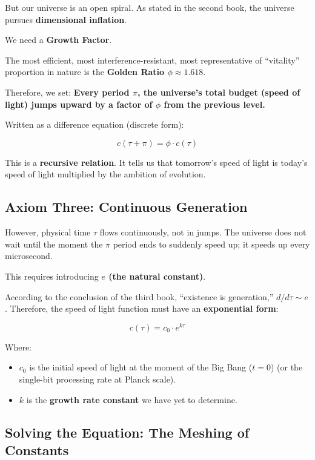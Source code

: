 But our universe is an open spiral. As stated in the second book, the universe pursues \textbf{dimensional inflation}.

We need a \textbf{Growth Factor}.

The most efficient, most interference-resistant, most representative of ``vitality'' proportion in nature is the \textbf{Golden Ratio $\phi \approx 1.618$}.

Therefore, we set: \textbf{Every period $\pi$, the universe's total budget (speed of light) jumps upward by a factor of $\phi$ from the previous level.}

Written as a difference equation (discrete form):

\[c(\tau + \pi) = \phi \cdot c(\tau)\]

This is a \textbf{recursive relation}. It tells us that tomorrow's speed of light is today's speed of light multiplied by the ambition of evolution.

\subsection{Axiom Three: Continuous Generation}

However, physical time $\tau$ flows continuously, not in jumps. The universe does not wait until the moment the $\pi$ period ends to suddenly speed up; it speeds up every microsecond.

This requires introducing \textbf{$e$ (the natural constant)}.

According to the conclusion of the third book, ``existence is generation,'' $d/d\tau \sim e$. Therefore, the speed of light function must have an \textbf{exponential form}:

\[c(\tau) = c_0 \cdot e^{k \tau}\]

Where:

\begin{itemize}
\item \textbf{$c_0$} is the initial speed of light at the moment of the Big Bang ($t=0$) (or the single-bit processing rate at Planck scale).

\item \textbf{$k$} is the \textbf{growth rate constant} we have yet to determine.
\end{itemize}

\subsection{Solving the Equation: The Meshing of Constants}

